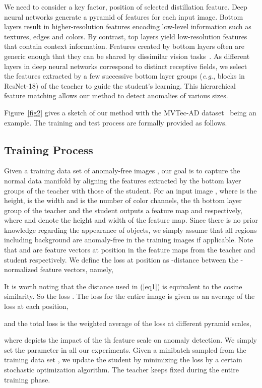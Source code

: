 \documentclass[final]{cvpr}
\begin{document}
{We need to consider a key factor, position of selected distillation feature. Deep neural networks generate a pyramid of features for each input image. Bottom layers result in higher-resolution features encoding low-level information such as textures, edges and colors. By contrast, top layers yield low-resolution features that contain context information. Features created by bottom layers often are generic enough that they can be shared by dissimilar vision tasks~\cite{Oquab2014,Zeiler2014}. As different layers in deep neural networks correspond to distinct receptive fields, we select the features extracted by a few successive bottom layer groups (\textit{e.g.}, blocks in ResNet-18) of the teacher to guide the student's learning. This hierarchical feature matching allows our method to detect anomalies of various sizes.

Figure~\ref{fig2} gives a sketch of our method with the MVTec-AD dataset~\cite{Bergmann2020} being an example. The training and test process are formally provided as follows.

\subsection{Training Process}
\label{sec3-sub1}

Given a training data set of anomaly-free images , our goal is to capture the normal data manifold by aligning the features extracted by the  bottom layer groups of the teacher with those of the student. For an input image , where  is the height,  is the width and  is the number of color channels, the th bottom layer group of the teacher and the student outputs a feature map  and  respectively, where  and  denote the height and width of the feature map. Since there is no prior knowledge regarding the appearance of objects, we simply assume that all regions including background are anomaly-free in the training images if applicable. Note that  and   are feature vectors at position  in the feature maps from the teacher and student respectively. We define the loss at position  as -distance between the -normalized feature vectors, namely,


It is worth noting that the  distance used in (\ref{eq1}) is equivalent to the cosine similarity. So the loss . The loss for the entire image  is given as an average of the loss at each position,

and the total loss is the weighted average of the loss at different pyramid scales,

where  depicts the impact of the th feature scale on anomaly detection. We simply set the parameter  in all our experiments. Given a minibatch  sampled from the training data set , we update the student by minimizing the loss  by a certain stochastic optimization algorithm. The teacher keeps fixed during the entire training phase.

}
\end{document}
